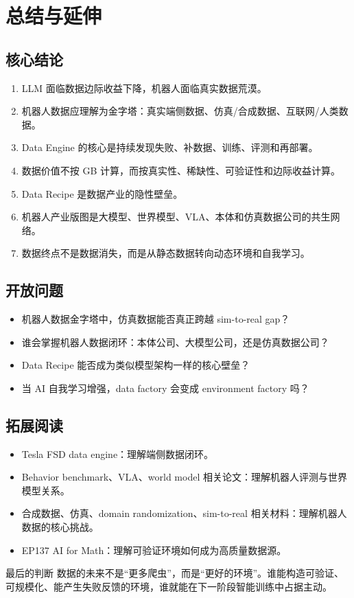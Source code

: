 \section{总结与延伸}

\subsection{核心结论}

\begin{enumerate}
\item LLM 面临数据边际收益下降，机器人面临真实数据荒漠。
\item 机器人数据应理解为金字塔：真实端侧数据、仿真/合成数据、互联网/人类数据。
\item Data Engine 的核心是持续发现失败、补数据、训练、评测和再部署。
\item 数据价值不按 GB 计算，而按真实性、稀缺性、可验证性和边际收益计算。
\item Data Recipe 是数据产业的隐性壁垒。
\item 机器人产业版图是大模型、世界模型、VLA、本体和仿真数据公司的共生网络。
\item 数据终点不是数据消失，而是从静态数据转向动态环境和自我学习。
\end{enumerate}

\subsection{开放问题}

\begin{itemize}
\item 机器人数据金字塔中，仿真数据能否真正跨越 sim-to-real gap？
\item 谁会掌握机器人数据闭环：本体公司、大模型公司，还是仿真数据公司？
\item Data Recipe 能否成为类似模型架构一样的核心壁垒？
\item 当 AI 自我学习增强，data factory 会变成 environment factory 吗？
\end{itemize}

\subsection{拓展阅读}

\begin{itemize}
\item Tesla FSD data engine：理解端侧数据闭环。
\item Behavior benchmark、VLA、world model 相关论文：理解机器人评测与世界模型关系。
\item 合成数据、仿真、domain randomization、sim-to-real 相关材料：理解机器人数据的核心挑战。
\item EP137 AI for Math：理解可验证环境如何成为高质量数据源。
\end{itemize}

\begin{importantbox}{最后的判断}
数据的未来不是“更多爬虫”，而是“更好的环境”。谁能构造可验证、可规模化、能产生失败反馈的环境，谁就能在下一阶段智能训练中占据主动。
\end{importantbox}


